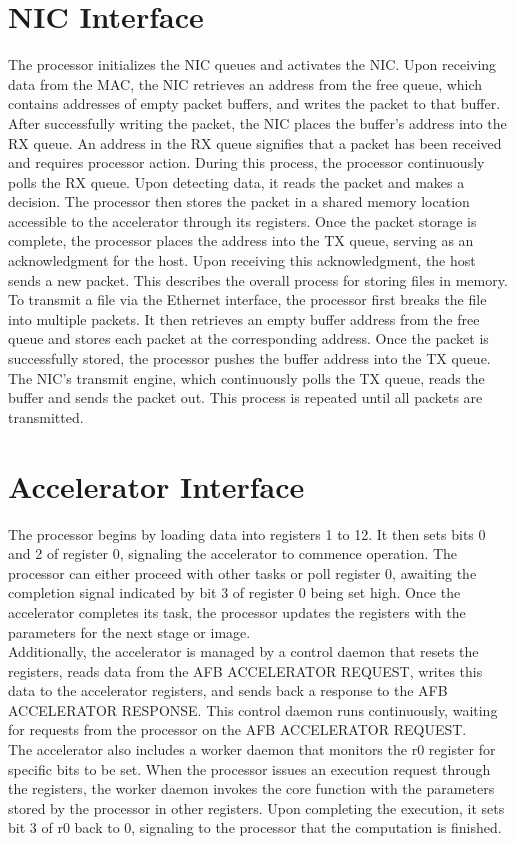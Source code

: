 \section{NIC Interface}
The processor initializes the NIC queues and activates the NIC. Upon receiving data from the MAC, the NIC retrieves an address from the free queue, which contains addresses of empty packet buffers, and writes the packet to that buffer. After successfully writing the packet, the NIC places the buffer's address into the RX queue. An address in the RX queue signifies that a packet has been received and requires processor action. During this process, the processor continuously polls the RX queue. Upon detecting data, it reads the packet and makes a decision. The processor then stores the packet in a shared memory location accessible to the accelerator through its registers. Once the packet storage is complete, the processor places the address into the TX queue, serving as an acknowledgment for the host. Upon receiving this acknowledgment, the host sends a new packet. This describes the overall process for storing files in memory.\\
To transmit a file via the Ethernet interface, the processor first breaks the file into multiple packets. It then retrieves an empty buffer address from the free queue and stores each packet at the corresponding address. Once the packet is successfully stored, the processor pushes the buffer address into the TX queue. The NIC's transmit engine, which continuously polls the TX queue, reads the buffer and sends the packet out. This process is repeated until all packets are transmitted.

\section{Accelerator Interface}
The processor begins by loading data into registers 1 to 12. It then sets bits 0 and 2 of register 0, signaling the accelerator to commence operation. The processor can either proceed with other tasks or poll register 0, awaiting the completion signal indicated by bit 3 of register 0 being set high. Once the accelerator completes its task, the processor updates the registers with the parameters for the next stage or image.\\
Additionally, the accelerator is managed by a control daemon that resets the registers, reads data from the AFB ACCELERATOR REQUEST, writes this data to the accelerator registers, and sends back a response to the AFB ACCELERATOR RESPONSE. This control daemon runs continuously, waiting for requests from the processor on the AFB ACCELERATOR REQUEST.\\
The accelerator also includes a worker daemon that monitors the r0 register for specific bits to be set. When the processor issues an execution request through the registers, the worker daemon invokes the core function with the parameters stored by the processor in other registers. Upon completing the execution, it sets bit 3 of r0 back to 0, signaling to the processor that the computation is finished.\\


